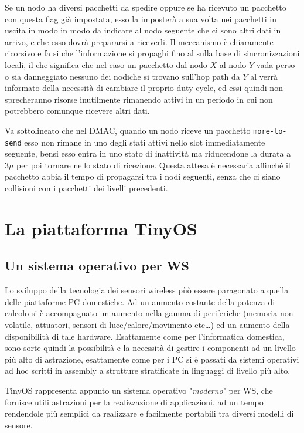 \documentclass[twoside,11pt,a4paper,italian,openany]{book}
\begin{document}
Se un nodo ha diversi pacchetti da spedire oppure se ha ricevuto un pacchetto con questa flag
già impostata, esso la imposterà a sua volta nei pacchetti in uscita in modo in modo da 
indicare al nodo seguente che ci sono altri dati in arrivo, e che esso dovrà prepararsi a 
riceverli. Il meccanismo è chiaramente ricorsivo e fa si che l'informazione si propaghi fino 
al \sink sulla base di sincronizzazioni locali, il che significa che nel caso un pacchetto dal 
nodo $X$ al nodo $Y$ vada perso o sia danneggiato nessuno dei nodiche si trovano sull'hop path da 
$Y$ al \sink verrà informato della necessità di cambiare il proprio duty cycle, ed essi quindi 
non sprecheranno risorse inutilmente rimanendo attivi in un periodo in cui non potrebbero 
comunque ricevere altri dati. 


Va sottolineato che nel DMAC, quando un nodo riceve un pacchetto \texttt{more-to-send} esso non 
rimane in uno degli stati attivi nello slot immediatamente seguente, bensi esso entra in uno stato di inattività ma riducendone la durata a  
$3\mu$ per poi tornare nello stato di ricezione. Questa attesa è necessaria affinché il 
pacchetto abbia il tempo di propagarsi tra i nodi seguenti, senza che ci siano collisioni con i
pacchetti dei livelli precedenti. 


\chapter{La piattaforma TinyOS}

\section{Un sistema operativo per WS}
Lo sviluppo della tecnologia dei sensori wireless pùò essere paragonato a quella delle 
piattaforme PC domestiche. Ad un aumento costante della potenza di calcolo si è accompagnato un 
aumento nella gamma di periferiche (memoria non volatile, attuatori, sensori di 
luce/calore/movimento etc\ldots) ed un aumento della disponibilità di tale hardware.
Esattamente come per l'informatica domestica, sono sorte quindi la possibilità e la necessità 
di gestire i
componenti ad un livello più alto di astrazione, esattamente come per i PC si è passati 
da sistemi operativi 
ad hoc scritti in assembly a strutture stratificate in linguaggi di livello più alto. 

TinyOS rappresenta appunto un sistema operativo "\emph{moderno}" per WS, che fornisce 
utili astrazioni per la realizzazione di applicazioni, ad un tempo rendendole più 
semplici da realizzare e facilmente portabili tra diversi modelli di sensore.
\end{document}
